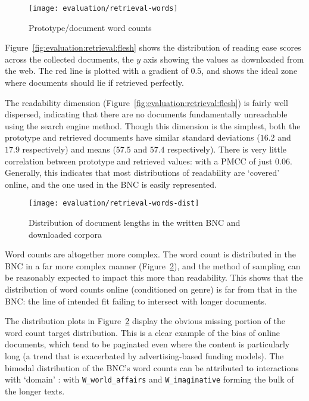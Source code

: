 \begin{figure}[Ht]
    \centering
    \texttt{[image: evaluation/retrieval-words]}
    \caption{Prototype/document word counts}
    \label{fig:evaluation:retrieval:words}
\end{figure}

Figure~\ref{fig:evaluation:retrieval:flesh} shows the distribution of reading ease scores across the collected documents, the $y$ axis showing the values as downloaded from the web.  The red line is plotted with a gradient of $0.5$, and shows the ideal zone where documents should lie if retrieved perfectly.


The readability dimension (Figure~\ref{fig:evaluation:retrieval:flesh}) is fairly well dispersed, indicating that there are no documents fundamentally unreachable using the search engine method.  Though this dimension is the simplest, both the prototype and retrieved documents have similar standard deviations ($16.2$ and $17.9$ respectively) and means ($57.5$ and $57.4$ respectively).  There is very little correlation between prototype and retrieved values: with a PMCC of just $0.06$.  Generally, this indicates that most distributions of readability are `covered' online, and the one used in the BNC is easily represented.

\begin{figure}[Ht]
    \centering
    \texttt{[image: evaluation/retrieval-words-dist]}
    \caption{Distribution of document lengths in the written BNC and downloaded corpora}
    \label{fig:evaluation:retrieval:words-dist}
\end{figure}

Word counts are altogether more complex.  The word count is distributed in the BNC in a far more complex manner (Figure~\ref{fig:evaluation:retrieval:words-dist}), and the method of sampling can be reasonably expected to impact this more than readability.  This shows that the distribution of word counts online (conditioned on genre) is far from that in the BNC: the line of intended fit failing to intersect with longer documents.

The distribution plots in Figure~\ref{fig:evaluation:retrieval:words-dist} display the obvious missing portion of the word count target distribution.  This is a clear example of the bias of online documents, which tend to be paginated even where the content is particularly long (a trend that is exacerbated by advertising-based funding models).  The bimodal distribution of the BNC's word counts can be attributed to interactions with `domain'%
: with \texttt{W\_world\_affairs} and \texttt{W\_imaginative} forming the bulk of the longer texts.

